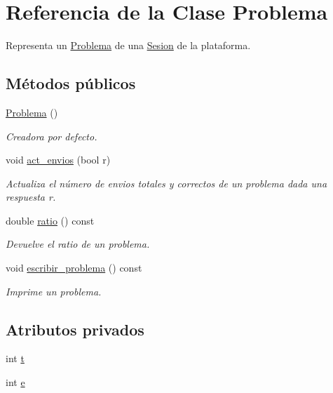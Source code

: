 \hypertarget{class_problema}{}\section{Referencia de la Clase Problema}
\label{class_problema}


Representa un \mbox{\hyperlink{class_problema}{Problema}} de una \mbox{\hyperlink{class_sesion}{Sesion}} de la plataforma.  


\subsection*{Métodos públicos}
\begin{DoxyCompactItemize}
\item 
\mbox{\hyperlink{class_problema_a9d81af5f3f42a1b4354ad8f3c022fca3}{Problema}} ()
\begin{DoxyCompactList}\small\item\em Creadora por defecto. \end{DoxyCompactList}\item 
void \mbox{\hyperlink{class_problema_a7867d1ae1e09f424283feae8c5b636c8}{act\+\_\+envios}} (bool r)
\begin{DoxyCompactList}\small\item\em Actualiza el número de envios totales y correctos de un problema dada una respuesta r. \end{DoxyCompactList}\item 
double \mbox{\hyperlink{class_problema_a8b41092b4207375e9f1bb4e29b9d4535}{ratio}} () const
\begin{DoxyCompactList}\small\item\em Devuelve el ratio de un problema. \end{DoxyCompactList}\item 
void \mbox{\hyperlink{class_problema_a347d893324235e849a4e73b8d101beb3}{escribir\+\_\+problema}} () const
\begin{DoxyCompactList}\small\item\em Imprime un problema. \end{DoxyCompactList}\end{DoxyCompactItemize}
\subsection*{Atributos privados}
\begin{DoxyCompactItemize}
\item 
int \mbox{\hyperlink{class_problema_a968bd889d6dc627efb59318ccc2eed7d}{t}}
\item 
int \mbox{\hyperlink{class_problema_a725a4c8c4faf4d1a646ef7ce9db37211}{e}}
\end{DoxyCompactItemize}


